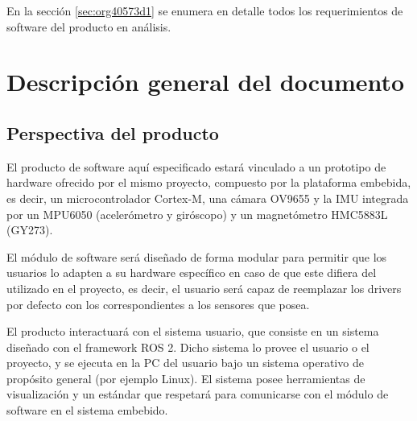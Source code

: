 \documentclass[12pt,a4paper, twosite]{article}
\begin{document}
En la sección \ref{sec:org40573d1} se enumera en detalle todos los requerimientos de software
del producto en análisis.

\section{Descripción general del documento}
\label{sec:orgc1c4017}




\subsection{Perspectiva del producto}
\label{sec:org24980a8}


El producto de software aquí especificado estará vinculado a un prototipo de hardware
ofrecido por el mismo proyecto, compuesto por la plataforma embebida, es decir,
un microcontrolador Cortex-M, una cámara OV9655 y la IMU integrada por un MPU6050 (acelerómetro
y giróscopo) y un magnetómetro HMC5883L (GY273).

El módulo de software será diseñado de forma modular para permitir que los usuarios lo
adapten a su hardware específico en caso de que este difiera del utilizado en el proyecto, es decir, el usuario será capaz de reemplazar los drivers por defecto con los correspondientes a
los sensores que posea.

El producto interactuará con el sistema usuario, que consiste en un sistema diseñado con el
framework ROS 2. Dicho sistema lo provee el usuario o el proyecto, y se ejecuta en la PC del
usuario bajo un sistema operativo de propósito general (por ejemplo Linux). El sistema posee
herramientas de visualización y un estándar que respetará para comunicarse con el módulo de
software en el sistema embebido.
\end{document}
